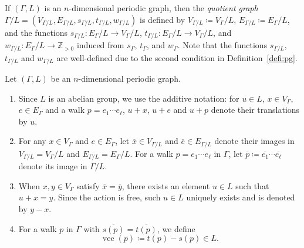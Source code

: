 \documentclass[ALCO,published]{cedram}
\theoremstyle{remark}
\begin{document}
If $(\Gamma, L)$ is an $n$-dimensional periodic graph, 
then the \textit{quotient graph} $\Gamma /L = (V_{\Gamma/L}, E_{\Gamma/L}, s_{\Gamma/L},t_{\Gamma/L},w_{\Gamma/L})$ is defined by 
$V_{\Gamma/L} \coloneqq  V_{\Gamma} /L$, $E_{\Gamma/L} \coloneqq  E_{\Gamma} /L$, 
and the functions $s_{\Gamma/L}: E_\Gamma/L \to V_\Gamma/L$, 
$t_{\Gamma/L}: E_\Gamma/L \to V_\Gamma/L$, and 
$w_{\Gamma/L}: E_\Gamma/L \to \mathbb{Z}_{>0}$ induced from $s_{\Gamma}$, $t_{\Gamma}$, and $w_{\Gamma}$. 
Note that the functions $s_{\Gamma/L}$, $t_{\Gamma/L}$ and $w_{\Gamma/L}$ 
are well-defined due to the second condition in Definition~\ref{defi:pg}.

\begin{defi}\label{defi:peri}
Let $(\Gamma,L)$ be an $n$-dimensional periodic graph.
\begin{enumerate}
\item Since $L$ is an abelian group, we use the additive notation: 
for $u \in L$, $x \in V_{\Gamma}$, $e \in E_{\Gamma}$ and a walk $p = e_1 \cdots e_{\ell}$,
$u + x$, $u + e$ and $u + p$ denote their translations by $u$. 

\item 
For any $x \in V_{\Gamma}$ and $e \in E_{\Gamma}$, 
let $\overline{x} \in V_{\Gamma /L}$ and $\overline{e} \in E_{\Gamma /L}$ denote their images in 
$V_{\Gamma /L} = V_{\Gamma} /L$ and $E_{\Gamma /L} = E_{\Gamma} /L$. 
For a walk $p = e_1 \cdots e_{\ell}$ in $\Gamma$, 
let $\overline{p} \coloneqq  \overline{e_1} \cdots \overline{e_{\ell}}$ denote its image in $\Gamma /L$. 

\item 
When $x, y \in V_{\Gamma}$ satisfy $\overline{x} = \overline{y}$, there exists an element $u \in L$ such that $u + x = y$. 
Since the action is free, such $u \in L$ uniquely exists and is denoted by $y - x$. 

\item 
For a walk $p$ in $\Gamma$ with $\overline{s(p)} = \overline{t(p)}$, we define 
\[
\operatorname{vec}(p) \coloneqq  t(p) - s(p) \in L. 
\]
\end{enumerate}
\end{defi}
\end{document}
